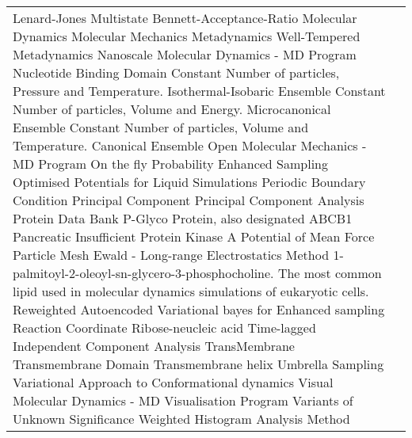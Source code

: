 \begin{center}
\begin{bfseries}
\begin{longtable}{@{}p{3cm}@{}p{\dimexpr\textwidth-1cm\relax}@{}}
\nomenclature{${\small LJ}$}       {Lenard-Jones}
\nomenclature{${\small MBAR}$}     {Multistate Bennett-Acceptance-Ratio}
\nomenclature{${\small MD}$}       {Molecular Dynamics}
\nomenclature{${\small MM}$}       {Molecular Mechanics}
\nomenclature{${\small MetaD}$}    {Metadynamics}
\nomenclature{${\small WT-MetaD}$} {Well-Tempered Metadynamics}
\nomenclature{${\small NAMD}$}     {Nanoscale Molecular Dynamics - MD Program}
\nomenclature{${\small NBD}$}      {Nucleotide Binding Domain}
\nomenclature{${\small NPT}$}      {Constant Number of particles, Pressure and Temperature. Isothermal-Isobaric Ensemble}
\nomenclature{${\small NVE}$}      {Constant Number of particles, Volume and Energy. Microcanonical Ensemble}
\nomenclature{${\small NVT}$}      {Constant Number of particles, Volume and Temperature. Canonical Ensemble}
\nomenclature{${\small OpenMM}$}   {Open Molecular Mechanics - MD Program}
\nomenclature{${\small OPES}$}     {On the fly Probability Enhanced Sampling}
\nomenclature{${\small OPLS}$}     {Optimised Potentials for Liquid Simulations}
\nomenclature{${\small PBC}$}      {Periodic Boundary Condition}
\nomenclature{${\small PC}$}       {Principal Component}
\nomenclature{${\small PCA}$}      {Principal Component Analysis}
\nomenclature{${\small PDB}$}      {Protein Data Bank}
\nomenclature{${\small PGP}$}      {P-Glyco Protein, also designated ABCB1}
\nomenclature{${\small PI}$}       {Pancreatic Insufficient}
\nomenclature{${\small PKA}$}      {Protein Kinase A}
\nomenclature{${\small PMF}$}      {Potential of Mean Force}
\nomenclature{${\small PME}$}      {Particle Mesh Ewald - Long-range Electrostatics Method}
\nomenclature{${\small POPC}$}     {1-palmitoyl-2-oleoyl-sn-glycero-3-phosphocholine. The most common lipid used in molecular dynamics simulations of eukaryotic cells.}
\nomenclature{${\small RAVE}$}     {Reweighted Autoencoded Variational bayes for Enhanced sampling}
\nomenclature{${\small RC}$}       {Reaction Coordinate}
\nomenclature{${\small RNA}$}      {Ribose-neucleic acid}
\nomenclature{${\small TICA}$}     {Time-lagged Independent Component Analysis}
\nomenclature{${\small TM}$}       {TransMembrane}
\nomenclature{${\small TMD}$}      {Transmembrane Domain}
\nomenclature{${\small TMH}$}      {Transmembrane helix}
\nomenclature{${\small US}$}       {Umbrella Sampling}
\nomenclature{${\small VAC}$}      {Variational Approach to Conformational dynamics}
\nomenclature{${\small VMD}$}      {Visual Molecular Dynamics - MD Visualisation Program}
\nomenclature{${\small VUS}$}      {Variants of Unknown Significance}
\nomenclature{${\small WHAM}$}     {Weighted Histogram Analysis Method}
\end{longtable}
\end{bfseries}
\end{center}
